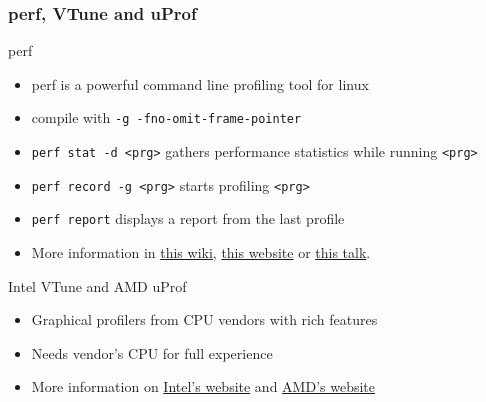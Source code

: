 \begin{frame}[fragile]
  \frametitle{perf, VTune and uProf}
  \begin{block}{perf}
    \begin{itemize}
      \item perf is a powerful command line profiling tool for linux
      \item compile with \texttt{-g -fno-omit-frame-pointer}
      \item \texttt{perf stat -d <prg>} gathers performance statistics while running \texttt{<prg>}
      \item \texttt{perf record -g <prg>} starts profiling \texttt{<prg>}
      \item \texttt{perf report} displays a report from the last profile
      \item More information in \href{https://perf.wiki.kernel.org/index.php/Main_Page}{this wiki}, \href{https://www.brendangregg.com/linuxperf.html}{this website} or \href{https://indico.cern.ch/event/980497/contributions/4130271/attachments/2161581/3647235/linux-systems-performance.pdf}{this talk}.
    \end{itemize}
  \end{block}
  \begin{block}{Intel VTune and AMD uProf}
    \begin{itemize}
      \item Graphical profilers from CPU vendors with rich features
      \item Needs vendor's CPU for full experience
      \item More information on \href{https://www.intel.com/content/www/us/en/developer/tools/oneapi/vtune-profiler.html}{Intel's website} and \href{https://developer.amd.com/amd-uprof/}{AMD's website}
    \end{itemize}
  \end{block}
\end{frame}
